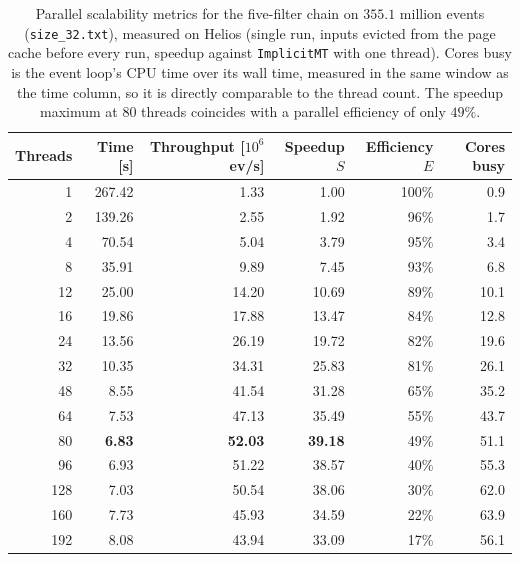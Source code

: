 \begin{table}[htbp]
\centering
\caption{Parallel scalability metrics for the five-filter chain on $355.1$ million events (\texttt{size\_32.txt}), measured on Helios (single run, inputs evicted from the page cache before every run, speedup against \texttt{ImplicitMT} with one thread). Cores busy is the event loop's CPU time over its wall time, measured in the same window as the time column, so it is directly comparable to the thread count. The speedup maximum at 80 threads coincides with a parallel efficiency of only $49\%$.}
\label{tab:scalability-chain}
\begin{tabular}{rrrrrr}
\toprule
Threads & Time [s] & Throughput [$10^6$ ev/s] & Speedup $S$ & Efficiency $E$ & Cores busy \\
\midrule
 1 & 267.42 & 1.33 & 1.00 & 100\% & 0.9 \\
 2 & 139.26 & 2.55 & 1.92 & 96\% & 1.7 \\
 4 & 70.54 & 5.04 & 3.79 & 95\% & 3.4 \\
 8 & 35.91 & 9.89 & 7.45 & 93\% & 6.8 \\
12 & 25.00 & 14.20 & 10.69 & 89\% & 10.1 \\
16 & 19.86 & 17.88 & 13.47 & 84\% & 12.8 \\
24 & 13.56 & 26.19 & 19.72 & 82\% & 19.6 \\
32 & 10.35 & 34.31 & 25.83 & 81\% & 26.1 \\
48 & 8.55 & 41.54 & 31.28 & 65\% & 35.2 \\
64 & 7.53 & 47.13 & 35.49 & 55\% & 43.7 \\
80 & \textbf{6.83} & \textbf{52.03} & \textbf{39.18} & 49\% & 51.1 \\
96 & 6.93 & 51.22 & 38.57 & 40\% & 55.3 \\
128 & 7.03 & 50.54 & 38.06 & 30\% & 62.0 \\
160 & 7.73 & 45.93 & 34.59 & 22\% & 63.9 \\
192 & 8.08 & 43.94 & 33.09 & 17\% & 56.1 \\
\bottomrule
\end{tabular}
\end{table}
